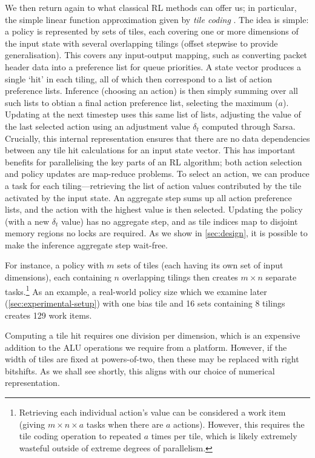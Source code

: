 \documentclass[
sigconf,natbib=false
]{acmart}
\begin{document}
We then return again to what classical RL methods can offer us; in particular, the simple linear function approximation given by \emph{tile coding} \cite[pp.\ \numrange{217}{221}]{RL2E}.
The idea is simple: a policy is represented by sets of tiles, each covering one or more dimensions of the input state with several overlapping tilings (offset stepwise to provide generalisation).
This covers any input-output mapping, such as converting packet header data into a preference list for queue priorities.
A state vector produces a single `hit' in each tiling, all of which then correspond to a list of action preference lists.
Inference (choosing an action) is then simply summing over all such lists to obtian a final action preference list, selecting the maximum ($a$).
Updating at the next timestep uses this same list of lists, adjusting the value of the last selected action using an adjustment value $\delta_t$ computed through Sarsa.
Crucially, this internal representation ensures that there are no data dependencies between any tile hit calculations for an input state vector.
This has important benefits for parallelising the key parts of an RL algorithm; both action selection and policy updates are map-reduce problems.
To select an action, we can produce a task for each tiling---retrieving the list of action values contributed by the tile activated by the input state.
An aggregate step sums up all action preference lists, and the action with the highest value is then selected.
Updating the policy (with a new $\delta_t$ value) has no aggregate step, and as tile indices map to disjoint memory regions no locks are required.
As we show in \cref{sec:design}, it is possible to make the inference aggregate step wait-free.

For instance, a policy with $m$ sets of tiles (each having its own set of input dimensions), each containing $n$ overlapping tilings then creates $m \times n$ separate tasks.\footnote{Retrieving each individual action's value can be considered a work item (giving $m \times n \times a$ tasks when there are $a$ actions). However, this requires the tile coding operation to repeated $a$ times per tile, which is likely extremely wasteful outside of extreme degrees of parallelism.}
As an example, a real-world policy size which we examine later (\cref{sec:experimental-setup}) with one bias tile and \num{16} sets containing \num{8} tilings creates \num{129} work items.

Computing a tile hit requires one division per dimension, which is an expensive addition to the ALU operations we require from a platform.
However, if the width of tiles are fixed at powers-of-two, then these may be replaced with right bitshifts.
As we shall see shortly, this aligns with our choice of numerical representation.
\end{document}
